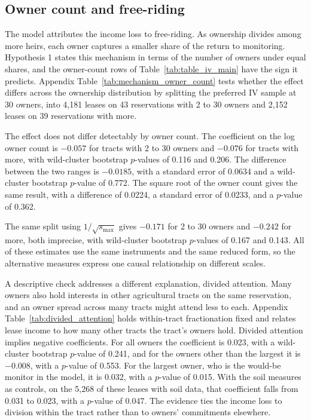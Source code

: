 \documentclass[12pt]{article}
\begin{document}
\subsection{Owner count and free-riding} \label{Mechanism}

The model attributes the income loss to free-riding. As ownership divides among more heirs, each owner captures a smaller share of the return to monitoring. Hypothesis 1 states this mechanism in terms of the number of owners under equal shares, and the owner-count rows of Table~\ref{tab:table_iv_main} have the sign it predicts. Appendix Table~\ref{tab:mechanism_owner_count} tests whether the effect differs across the ownership distribution by splitting the preferred IV sample at 30 owners, into 4,181 leases on 43 reservations with 2 to 30 owners and 2,152 leases on 39 reservations with more.

The effect does not differ detectably by owner count. The coefficient on the log owner count is $-0.057$ for tracts with 2 to 30 owners and $-0.076$ for tracts with more, with wild-cluster bootstrap $p$-values of 0.116 and 0.206. The difference between the two ranges is $-0.0185$, with a standard error of 0.0634 and a wild-cluster bootstrap $p$-value of 0.772. The square root of the owner count gives the same result, with a difference of 0.0224, a standard error of 0.0233, and a $p$-value of 0.362.

The same split using $1/\sqrt{s_{\max}}$ gives $-0.171$ for 2 to 30 owners and $-0.242$ for more, both imprecise, with wild-cluster bootstrap $p$-values of 0.167 and 0.143. All of these estimates use the same instruments and the same reduced form, so the alternative measures express one causal relationship on different scales.

A descriptive check addresses a different explanation, divided attention. Many owners also hold interests in other agricultural tracts on the same reservation, and an owner spread across many tracts might attend less to each. Appendix Table~\ref{tab:divided_attention} holds within-tract fractionation fixed and relates lease income to how many other tracts the tract's owners hold. Divided attention implies negative coefficients. For all owners the coefficient is 0.023, with a wild-cluster bootstrap $p$-value of 0.241, and for the owners other than the largest it is $-0.008$, with a $p$-value of 0.553. For the largest owner, who is the would-be monitor in the model, it is 0.032, with a $p$-value of 0.015. With the soil measures as controls, on the 5,268 of these leases with soil data, that coefficient falls from 0.031 to 0.023, with a $p$-value of 0.047. The evidence ties the income loss to division within the tract rather than to owners' commitments elsewhere.
\end{document}
